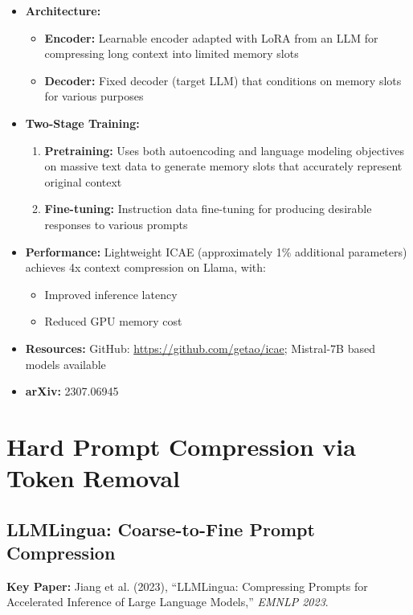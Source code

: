 \documentclass[11pt]{article}
\begin{document}
\begin{itemize}[leftmargin=*]
    \item \textbf{Architecture:}
    \begin{itemize}
        \item \textbf{Encoder:} Learnable encoder adapted with LoRA from an LLM for compressing long context into limited memory slots
        \item \textbf{Decoder:} Fixed decoder (target LLM) that conditions on memory slots for various purposes
    \end{itemize}
    \item \textbf{Two-Stage Training:}
    \begin{enumerate}
        \item \textbf{Pretraining:} Uses both autoencoding and language modeling objectives on massive text data to generate memory slots that accurately represent original context
        \item \textbf{Fine-tuning:} Instruction data fine-tuning for producing desirable responses to various prompts
    \end{enumerate}
    \item \textbf{Performance:} Lightweight ICAE (approximately 1\% additional parameters) achieves 4x context compression on Llama, with:
    \begin{itemize}
        \item Improved inference latency
        \item Reduced GPU memory cost
    \end{itemize}
    \item \textbf{Resources:} GitHub: \url{https://github.com/getao/icae}; Mistral-7B based models available
    \item \textbf{arXiv:} 2307.06945
\end{itemize}

\section{Hard Prompt Compression via Token Removal}

\subsection{LLMLingua: Coarse-to-Fine Prompt Compression}

\textbf{Key Paper:} Jiang et al. (2023), ``LLMLingua: Compressing Prompts for Accelerated Inference of Large Language Models,'' \textit{EMNLP 2023}.
\end{document}
